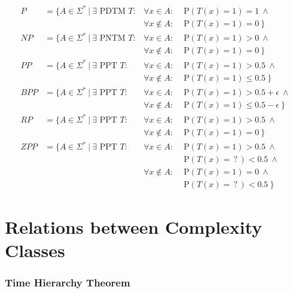\documentclass[
    13pt,
    oneside,
    a4paper,
    numbers=enddot,
    abstractoff,
    parskip=full
]{scrreprt}
\begin{document}
\begin{align*}
    P & = \{
    A \in \Sigma^\ast ~|~
    \exists \text{ PDTM } T:
    & \forall x \in A:      & \text{ P}(T(x)=1) = 1 ~\land \\
    & & \forall x \notin A: & \text{ P}(T(x)=1) = 0 ~\}
    \\
    NP & = \{
    A \in \Sigma^\ast ~|~
    \exists \text{ PNTM } T:
    & \forall x \in A:      & \text{ P}(T(x)=1) > 0 ~\land \\
    & & \forall x \notin A: & \text{ P}(T(x)=1) = 0 ~\}
    \\
    PP & = \{
    A \in \Sigma^\ast ~|~
    \exists \text{ PPT } T:
    & \forall x \in A:      & \text{ P}(T(x)=1) > 0.5 ~\land \\
    & & \forall x \notin A: & \text{ P}(T(x)=1) \leq 0.5 ~\}
    \\
    BPP & = \{
    A \in \Sigma^\ast ~|~
    \exists \text{ PPT } T:
    & \forall x \in A:      & \text{ P}(T(x)=1) > 0.5 + \epsilon ~\land \\
    & & \forall x \notin A: & \text{ P}(T(x)=1) \leq 0.5 - \epsilon ~\}
    \\
    RP & = \{
    A \in \Sigma^\ast ~|~
    \exists \text{ PPT } T:
    & \forall x \in A:      & \text{ P}(T(x)=1) > 0.5 ~\land \\
    & & \forall x \notin A: & \text{ P}(T(x)=1) = 0 ~\}
    \\
    ZPP & = \{
    A \in \Sigma^\ast ~|~
    \exists \text{ PPT } T:
    & \forall x \in A:      & \text{ P}(T(x)=1) > 0.5 ~\land \\
    & &                     & \text{ P}(T(x)=\,?\,) < 0.5 ~\land \\
    & & \forall x \notin A: & \text{ P}(T(x)=1) = 0 ~\land \\
    & &                     & \text{ P}(T(x)=\,?\,) < 0.5 ~\}
\end{align*}






\section*{Relations between Complexity Classes}
\label{sec:relations_between_complexity_classes}



\subsubsection*{Time Hierarchy Theorem}
\end{document}
